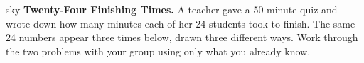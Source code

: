 \documentclass[12pt]{article}
\begin{document}

\vspace{0.02in}

\begin{headlinebox}{sky}
\textbf{Twenty-Four Finishing Times.} A teacher gave a 50-minute quiz and wrote down how many
minutes each of her 24 students took to finish. The same 24 numbers appear three times below,
drawn three different ways. Work through the two problems with your group using only what you
already know.
\end{headlinebox}

\vspace{0.04in}
\end{document}
